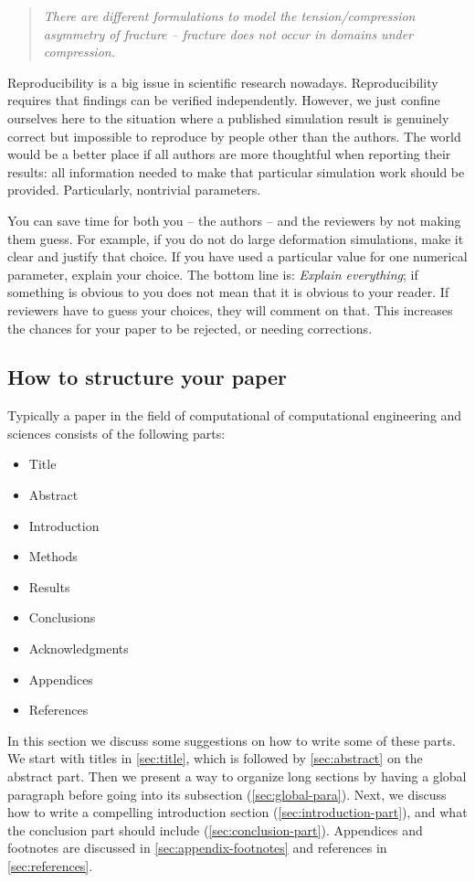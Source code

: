 \documentclass[authoryear,12pta4paper,fleqn]{article}
\numberwithin{equation}{section}
\theoremstyle{remark}
\begin{document}
 \begin{quote}
    \textit{There are different formulations  to model the tension/compression asymmetry of 
    fracture – fracture does not occur in domains under compression.}
 \end{quote}


Reproducibility is a big issue in scientific research nowadays. Reproducibility requires that findings can be verified independently.
However, we just confine ourselves here to the situation where a published simulation result is genuinely correct but impossible to reproduce by people other than the authors. The world would be a better place if all authors are more thoughtful when reporting their results: all information needed to make that particular simulation work should be provided. Particularly, nontrivial parameters.


You can save time for both you -- the authors -- and the reviewers by not making them guess. For example, if you do not do large deformation simulations, make it clear and justify that choice. If you have used a particular value for one numerical parameter, explain your choice. The bottom line is: \textit{Explain everything}; if something is obvious to you does not mean that it is obvious to your reader. If reviewers have to guess your choices, they will comment on that. This increases the chances for your paper to be rejected, or needing corrections.




\subsection{How to structure your paper}\label{structure}

Typically a paper in the field of computational of computational engineering and sciences consists of the following parts:

\begin{itemize}
    \item Title
    \item Abstract
    \item Introduction
    \item Methods
    \item Results
    \item Conclusions
    \item Acknowledgments
    \item Appendices
    \item References
\end{itemize}
 In this section we discuss some suggestions on how to write some of these parts. We start with titles in \cref{sec:title}, which is followed by \cref{sec:abstract} on the abstract part. Then we present a way to organize long sections by having a global paragraph before going into its subsection (\cref{sec:global-para}). Next, we discuss how to write a compelling introduction section (\cref{sec:introduction-part}), and 
what the conclusion part  should include (\cref{sec:conclusion-part}).  Appendices and footnotes are discussed in \cref{sec:appendix-footnotes} and references in \cref{sec:references}.
\end{document}
